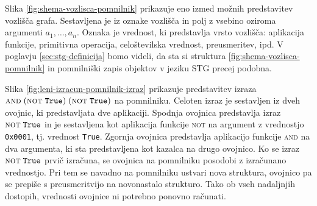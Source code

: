Slika \ref{fig:shema-vozlisca-pomnilnik} prikazuje eno izmed možnih predstavitev vozlišča grafa. Sestavljena je iz oznake vozlišča in polj z vsebino oziroma argumenti $a_1, \dots, a_n$.  Oznaka je vrednost, ki predstavlja vrsto vozlišča: aplikacija funkcije, primitivna operacija, celoštevilska vrednost, preusmeritev, ipd. V poglavju \ref{sec:stg-definicija} bomo videli, da sta si struktura \ref{fig:shema-vozlisca-pomnilnik} in pomnilniški zapis objektov v jeziku STG precej podobna.

\begin{figure*}[ht]
	\centering
	\caption{Pomnilniška predstavitev vozlišča grafa}
	\label{fig:shema-vozlisca-pomnilnik}
\end{figure*}

Slika \ref{fig:leni-izracun-pomnilnik-izraz} prikazuje predstavitev izraza $\textsc{and} \; (\textsc{not} \; \texttt{True}) \; (\textsc{not} \; \texttt{True})$ na pomnilniku. Celoten izraz je sestavljen iz dveh ovojnic, ki predstavljata dve aplikaciji. Spodnja ovojnica predstavlja izraz $\textsc{not} \; \texttt{True}$ in je sestavljena kot aplikacija funkcije \textsc{not} na argument z vrednostjo \texttt{0x0001}, tj. vrednost \texttt{True}. Zgornja ovojnica predstavlja aplikacijo funkcije \textsc{and} na dva argumenta, ki sta predstavljena kot kazalca na drugo ovojnico. Ko se izraz $\textsc{not} \; \texttt{True}$ prvič izračuna, se ovojnica na pomnilniku posodobi z iz\-ra\-ču\-na\-no vrednostjo. Pri tem se navadno na pomnilniku ustvari nova struktura, ovojnico pa se prepiše s preusmeritvijo na novonastalo strukturo. Tako ob vseh nadaljnjih dostopih, vrednosti ovojnice ni potrebno ponovno računati.


